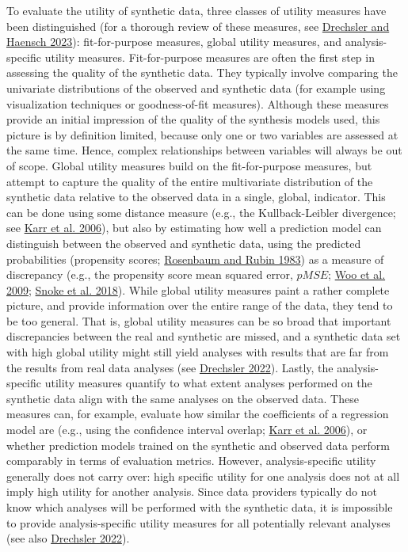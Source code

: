 \documentclass[
]{template/style/uneceart}
\begin{document}
To evaluate the utility of synthetic data, three classes of utility
measures have been distinguished (for a thorough review of these
measures, see \protect\hyperlink{ref-drechsler2023}{Drechsler and
Haensch 2023}): fit-for-purpose measures, global utility measures, and
analysis-specific utility measures. Fit-for-purpose measures are often
the first step in assessing the quality of the synthetic data. They
typically involve comparing the univariate distributions of the observed
and synthetic data (for example using visualization techniques or
goodness-of-fit measures). Although these measures provide an initial
impression of the quality of the synthesis models used, this picture is
by definition limited, because only one or two variables are assessed at
the same time. Hence, complex relationships between variables will
always be out of scope. Global utility measures build on the
fit-for-purpose measures, but attempt to capture the quality of the
entire multivariate distribution of the synthetic data relative to the
observed data in a single, global, indicator. This can be done using
some distance measure (e.g., the Kullback-Leibler divergence; see
\protect\hyperlink{ref-karr_utility_2006}{Karr et al. 2006}), but also
by estimating how well a prediction model can distinguish between the
observed and synthetic data, using the predicted probabilities
(propensity scores;
\protect\hyperlink{ref-rosenbaum_propensity_scores_1983}{Rosenbaum and
Rubin 1983}) as a measure of discrepancy (e.g., the propensity score
mean squared error, \(pMSE\);
\protect\hyperlink{ref-Woo_global_2009}{Woo et al. 2009};
\protect\hyperlink{ref-snoke_utility_2018}{Snoke et al. 2018}). While
global utility measures paint a rather complete picture, and provide
information over the entire range of the data, they tend to be too
general. That is, global utility measures can be so broad that important
discrepancies between the real and synthetic are missed, and a synthetic
data set with high global utility might still yield analyses with
results that are far from the results from real data analyses (see
\protect\hyperlink{ref-drechsler_utility_2022}{Drechsler 2022}). Lastly,
the analysis-specific utility measures quantify to what extent analyses
performed on the synthetic data align with the same analyses on the
observed data. These measures can, for example, evaluate how similar the
coefficients of a regression model are (e.g., using the confidence
interval overlap; \protect\hyperlink{ref-karr_utility_2006}{Karr et al.
2006}), or whether prediction models trained on the synthetic and
observed data perform comparably in terms of evaluation metrics.
However, analysis-specific utility generally does not carry over: high
specific utility for one analysis does not at all imply high utility for
another analysis. Since data providers typically do not know which
analyses will be performed with the synthetic data, it is impossible to
provide analysis-specific utility measures for all potentially relevant
analyses (see also
\protect\hyperlink{ref-drechsler_utility_2022}{Drechsler 2022}).
\end{document}
